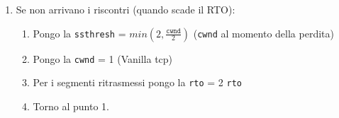 \documentclass[a4paper]{article}
\begin{document}
\begin{itemize}
\begin{enumerate}
      \item Se non arrivano i riscontri (quando scade il RTO):
        \begin{enumerate}
          \item 
            Pongo la \texttt{ssthresh} = \( min\left(2,\frac{\texttt{cwnd}}{2}\right) \) (\texttt{cwnd} al momento della
            perdita)
          \item Pongo la \texttt{cwnd} = 1 (Vanilla tcp)
          \item Per i segmenti ritrasmessi pongo la \texttt{rto} = 2 \texttt{rto} 
          \item Torno al punto 1.
        \end{enumerate}
    \end{enumerate}
\end{itemize}
\end{document}
